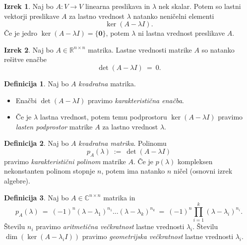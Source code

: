 \documentclass[11pt]{article}
\newcommand{\R}{\mathbb{R}}
\newcommand{\0}{\mathbf{0}}
\theoremstyle{definition}
\newtheorem{definicija}{Definicija}[section]
\theoremstyle{definition}
\theoremstyle{definition}
\newtheorem{izrek}{Izrek}[section]
\theoremstyle{definition}
\begin{document}
\begin{izrek}

Naj bo $A: V \rightarrow V$ linearna preslikava in $\lambda$ nek skalar. Potem so lastni vektorji preslikave $A$ za lastno vrednost $\lambda$ natanko neničelni elementi
$$\ker (A-\lambda I).$$
Če je jedro $\ker (A-\lambda I) = \{\0\}$, potem $\lambda$ ni lastna vrednost preslikave $A$.

\end{izrek}
\vspace{0.5cm}

\begin{izrek}

Naj bo $A \in \R^{n \times n}$ matrika. Lastne vrednosti matrike $A$ so natanko rešitve enačbe
$$\det (A-\lambda I) ~=~ 0.$$

\end{izrek}
\vspace{0.5cm}

\begin{definicija}

Naj bo $A$ \textit{kvadratna} matrika.
\begin{itemize}

\item Enačbi $\det (A-\lambda I)$ pravimo \textit{karakteristična enačba}.

\item Če je $\lambda$ lastna vrednost, potem temu podprostoru $\ker (A-\lambda I)$ pravimo \textit{lasten podprostor} matrike $A$ za lastno vrednost $\lambda$.

\end{itemize}

\end{definicija}
\vspace{0.5cm}

\begin{definicija}

Naj bo $A$ \textit{kvadratna matrika}. Polinomu
$$p_A(\lambda) ~:=~ \det (A-\lambda I)$$
pravimo \textit{karakteristični polinom} matrike $A$. Če je $p(\lambda)$ kompleksen nekonstanten polinom stopnje $n$, potem ima natanko $n$ ničel (osnovni izrek algebre).

\end{definicija}
\vspace{0.5cm}

\begin{definicija}

Naj bo $A \in \mathbb{C}^{n \times n}$ matrika in 
$$p_A(\lambda) ~=~ (-1)^n(\lambda-\lambda_1)^{n_1} \ldots (\lambda-\lambda_k)^{n_k} ~=~ (-1)^n\prod_{i=1}^k (\lambda-\lambda_i)^{n_i}.$$
Številu $n_i$ pravimo \textit{aritmetična večkratnost} lastne vrednosti $\lambda_i$. Številu $\dim(\ker(A-\lambda_i I))$ pravimo \textit{geometrijska večkratnost} lastne vrednosti $\lambda_i$.

\end{definicija}
\vspace{0.5cm}
\end{document}
